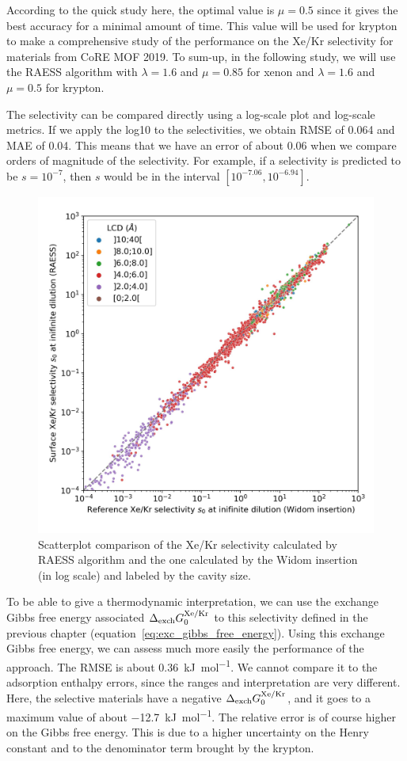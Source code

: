 \documentclass[main]{subfiles}
\begin{document}
According to the quick study here, the optimal value is $\mu=0.5$ since it gives the best accuracy for a minimal amount of time. This value will be used for krypton to make a comprehensive study of the performance on the Xe/Kr selectivity for materials from CoRE MOF 2019. To sum-up, in the following study, we will use the RAESS algorithm with $\lambda=1.6$ and $\mu=0.85$ for xenon and $\lambda=1.6$ and $\mu=0.5$ for krypton.

The selectivity can be compared directly using a log-scale plot and log-scale metrics. If we apply the log10 to the selectivities, we obtain RMSE of 0.064 and MAE of 0.04. This means that we have an error of about 0.06 when we compare orders of magnitude of the selectivity. For example, if a selectivity is predicted to be $s = 10^{-7}$, then $s$ would be in the interval $[10^{-7.06},10^{-6.94}]$.

\begin{figure}[ht]
\centering
  \includegraphics[width=0.5\linewidth]{figures/3-fastsim/s_0_widom_vs_s_0_surface_zoom.jpg}
  \caption{Scatterplot comparison of the Xe/Kr selectivity calculated by RAESS algorithm and the one calculated by the Widom insertion (in log scale) and labeled by the cavity size. }\label{fgr:s_0}
\end{figure}

To be able to give a thermodynamic interpretation, we can use the exchange Gibbs free energy associated $\Delta_{\text{exch}}G_{\text{0}}^{\text{Xe/Kr}}$ to this selectivity defined in the previous chapter (equation~\ref{eq:exc_gibbs_free_energy}). Using this exchange Gibbs free energy, we can assess much more easily the performance of the approach. The RMSE is about \SI{0.36}{\kilo\joule\per\mole}. We cannot compare it to the adsorption enthalpy errors, since the ranges and interpretation are very different. Here, the selective materials have a negative $\Delta_{\text{exch}}G_{\text{0}}^{\text{Xe/Kr}}$, and it goes to a maximum value of about \SI{-12.7}{\kilo\joule\per\mole}. The relative error is of course higher on the Gibbs free energy. This is due to a higher uncertainty on the Henry constant and to the denominator term brought by the krypton.
\end{document}
